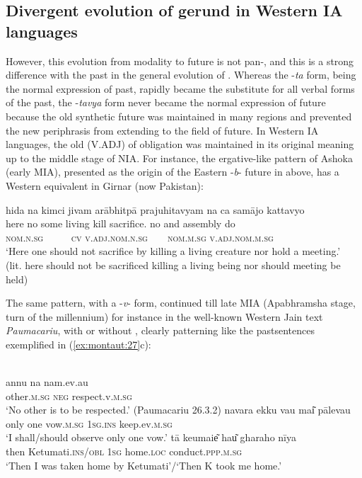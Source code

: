 \documentclass[output=paper]{langsci/langscibook}
\begin{document}
\subsection{Divergent evolution of gerund in Western IA languages}\label{sec:montaut:3.3}

However, this evolution from modality to future is not pan-, and this is a strong difference with the past in the general evolution of . Whereas the -\textit{ta} form, being the normal expression of past, rapidly became the substitute for all verbal forms of the past, the -\textit{tavya} form never became the normal expression of future because the old synthetic future was maintained in many regions and prevented the new periphrasis from extending to the field of future.
In Western IA languages, the old  (V.ADJ) of obligation was maintained in its original meaning up to the middle stage of NIA. For instance, the ergative-like pattern of Ashoka (early MIA), presented as the origin of the Eastern -\textit{b}{}- future in  above, has a Western equivalent in Girnar (now Pakistan):


\ea\label{ex:montaut:26}
\glll hida na kimci   jivam     arābhitpā  prajuhitavyam    na ca    samājo      kattavyo\\
 here no some   living     kill         sacrifice.          no and  assembly    do \\
\textsc{nom.n.sg}  ~ ~  ~  \textsc{cv}    \textsc{v.adj.nom.n.sg} ~ ~   \textsc{nom.m.sg} \textsc{v.adj.nom.m.sg}  \\
\glt ‘Here one should not sacrifice by killing a living creature nor hold a meeting.’ \\
 (lit. here should not be sacrificed killing a living being nor should meeting be held)
\z 

The same pattern, with a -\textit{v}- form, continued till late MIA (Apabhramsha stage, turn of the millennium) for instance in the well-known Western Jain text \textit{Paumacariu}, with or without , clearly patterning like the past\largerpage sentences exemplified in (\ref{ex:montaut:27}c):

\ea \label{ex:montaut:27}
\ea 
{}\\
\gll annu na nam.ev.au\\
 other.\textsc{m.sg}   \textsc{neg}   respect.v.\textsc{m.sg}  \\
\glt ‘No other is to be respected.’ (Paumacariu 26.3.2)
\ex 
\gll navara  ekku vau  mai͂  pālevau\\
 only one  vow.\textsc{m.sg}   \textsc{1sg.ins}   keep.ev.\textsc{m.sg}  \\
\glt ‘I shall/should observe only one vow.’ \citep[194]{Bubenik1998}
\ex    
\gll tā  keumaie͂  hau͂   gharaho  nīya\\
     then   Ketumati.\textsc{ins/obl} \textsc{1sg}   home.\textsc{loc} conduct.\textsc{ppp.m.sg}\\
\glt ‘Then I was taken home by Ketumati’/‘Then K took me home.’ \citep[148]{Bubenik1998}
\z 
\z 
\end{document}
